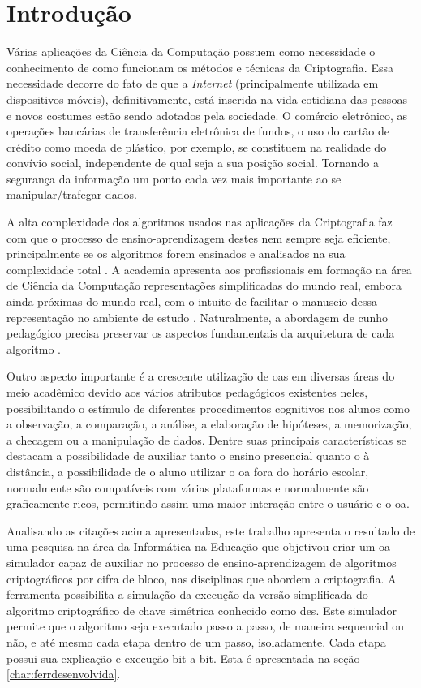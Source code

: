 \chapter{Introdução}
\label{char:intro}
Várias aplicações da Ciência da Computação possuem como necessidade o conhecimento de como funcionam os métodos e técnicas da Criptografia. Essa necessidade decorre do fato de que a \textit{Internet} (principalmente utilizada em dispositivos móveis), definitivamente, está inserida na vida cotidiana das pessoas e novos costumes estão sendo adotados pela sociedade. O comércio eletrônico, as operações bancárias de transferência eletrônica de fundos, o uso do cartão de crédito como moeda de plástico, por exemplo, se constituem na realidade do convívio social, independente de qual seja a sua posição social. Tornando a segurança da informação um ponto cada vez mais importante ao se manipular/trafegar dados.\cite{silva09} \cite{silva12}

A alta complexidade dos algoritmos usados nas aplicações da Criptografia faz com que o processo de ensino-aprendizagem destes nem sempre seja eficiente, principalmente se os algoritmos forem ensinados e analisados na sua complexidade total \cite{silva09} \cite{silva12}. A academia apresenta aos profissionais em formação na área de Ciência da Computação representações simplificadas do mundo real, embora ainda próximas do mundo real, com o intuito de facilitar o manuseio dessa representação no ambiente de estudo \cite{maia01} \cite{maia03} \cite{kioki08}. Naturalmente, a abordagem de cunho pedagógico precisa preservar os aspectos fundamentais da arquitetura de cada algoritmo \cite{garmpis11} \cite{lopes12}.

Outro aspecto importante é a crescente utilização de \acrfull{oas} em diversas áreas do meio acadêmico devido aos vários atributos pedagógicos existentes neles, possibilitando o estímulo de diferentes procedimentos cognitivos nos alunos como a observação, a comparação, a análise, a elaboração de hipóteses, a memorização, a checagem ou a manipulação de dados. Dentre suas principais características se destacam a possibilidade de auxiliar tanto o ensino presencial quanto o à distância, a possibilidade de o aluno utilizar o \acrshort{oa} fora do horário escolar, normalmente são compatíveis com várias plataformas e normalmente são graficamente ricos, permitindo assim uma maior interação entre o usuário e o \acrshort{oa}. \cite{barbosa15}

Analisando as citações acima apresentadas, este trabalho apresenta o resultado de uma pesquisa na área da Informática na Educação que objetivou criar um \acrshort{oa} simulador capaz de auxiliar no processo de ensino-aprendizagem de algoritmos criptográficos por cifra de bloco, nas disciplinas que abordem a criptografia. A ferramenta possibilita a simulação da execução da versão simplificada do algoritmo criptográfico de chave simétrica conhecido como \acrfull{des}. Este simulador permite que o algoritmo seja executado passo a passo, de maneira sequencial ou não, e até mesmo cada etapa dentro de um passo, isoladamente. Cada etapa possui sua explicação e execução bit a bit. Esta é apresentada na seção \ref{char:ferrdesenvolvida}.

